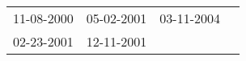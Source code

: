 \begin{supertabular}{llll}
 11-08-2000 &  05-02-2001 &  03-11-2004 \\
 02-23-2001 &  12-11-2001 &             \\
\end{supertabular}
